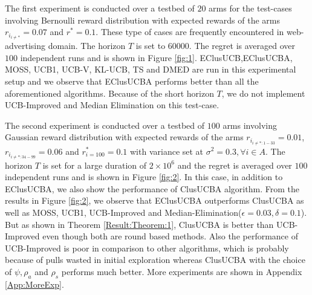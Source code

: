 The first experiment is conducted over a testbed of $20$ arms for the test-cases involving Bernoulli reward distribution with expected rewards of the arms $r_{i_{{i}\neq {*}}}=0.07$ and $r^{*}=0.1$. These type of cases are frequently encountered in web-advertising domain. The horizon $T$ is set to $60000$. 
The regret is averaged over $100$ independent runs and is shown in Figure \ref{fig:1}. EClusUCB,EClusUCBA, MOSS, UCB1, UCB-V, KL-UCB, TS and DMED are run in this experimental setup and we observe that EClusUCBA performs better than all the aforementioned algorithms. Because of the short horizon $T$, we do not implement UCB-Improved and Median Elimination on this test-case. 

	The second experiment is conducted over a testbed of $100$ arms involving Gaussian reward distribution with expected rewards of the arms $r_{i_{{i}\neq {*}:1-33}}=0.01$, $r_{i_{{i}\neq {*}:34-99}}=0.06$ and $r^{*}_{i=100}=0.1$ with variance set at $\sigma^{2} = 0.3,\forall i\in A$. The horizon $T$ is set for a large duration of $2\times 10^{6}$ and the regret is averaged over $100$ independent runs and is shown in Figure \ref{fig:2}. In this case, in addition to EClusUCBA, we also show the performance of ClusUCBA algorithm. From the results in Figure \ref{fig:2}, we observe that EClusUCBA outperforms ClusUCBA as well as MOSS, UCB1, UCB-Improved and Median-Elimination($\epsilon=0.03,\delta=0.1$). But as shown in Theorem \ref{Result:Theorem:1}, ClusUCBA is better than UCB-Improved even though both are round based methods. Also the performance of UCB-Improved is poor in comparison to other algorithms, which is probably because of pulls wasted in initial exploration whereas ClusUCBA with the choice of $\psi, \rho_{a}$ and $\rho_{s}$ performs much better. More experiments are shown in Appendix \ref{App:MoreExp}.

